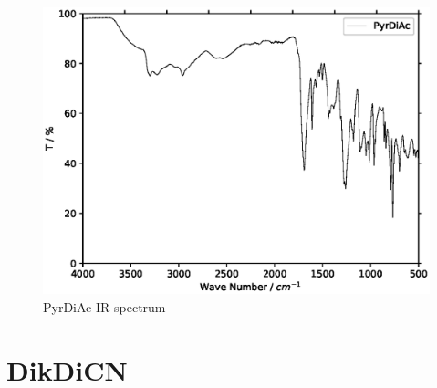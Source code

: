 \documentclass[../Master.tex]{subfiles}
\begin{document}
\begin{figure}[h!]
	\centering
	\includegraphics[width=12cm,keepaspectratio]{Spectra/ir/PyrDiAc.eps}
	\caption{PyrDiAc IR spectrum}
\end{figure}

\section{DikDiCN}
\end{document}
